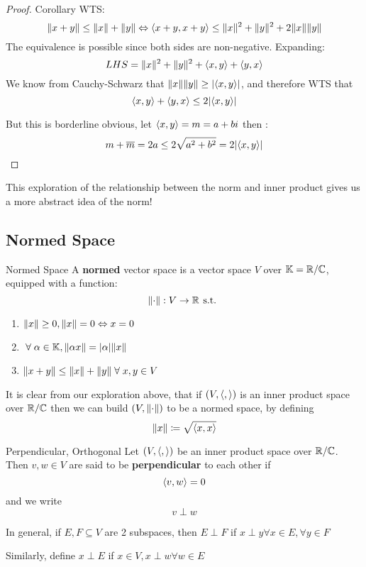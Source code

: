 \begin{proof} {Corollary}
    WTS: \[
        \lVert x + y\rVert \leq \lVert x\rVert + \lVert y\rVert \Leftrightarrow \langle x+y, x+y \rangle \leq \lVert x\rVert^2 + \lVert y\rVert^2 + 2 \lVert x\rVert\lVert y\rVert
    \]
    The equivalence is possible since both sides are non-negative. Expanding:
    \[
        LHS = \lVert x\rVert^2 + \lVert y\rVert^2 + \langle x, y \rangle + \langle y, x \rangle
    \]
    We know from Cauchy-Schwarz that \(\lVert x\rVert \lVert y\rVert \geq \lvert\langle x, y \rangle\rvert\), and therefore WTS that \[
        \langle x, y \rangle + \langle y, x \rangle \leq 2 \lvert\langle x, y \rangle\rvert
    \]

    But this is borderline obvious, let \(\langle x, y \rangle = m = a + bi\) then : \[
        m + \overline{m} = 2 a \leq 2 \sqrt{a^2 + b^2} = 2 \lvert\langle x, y \rangle\rvert
    \]
\end{proof}

This exploration of the relationship between the norm and inner product gives us a more abstract idea of the norm!

\subsection{Normed Space}
\begin{definition} {Normed Space}
    A \textbf{normed} vector space is a vector space \(V\) over \(\mathbb{K} = \mathbb{R} / \mathbb{C}\), equipped with a function: \[
        \lVert\cdot\rVert: V \to \mathbb{R} \hspace*{4pt}\text{s.t.}\hspace*{4pt}
    \]
    \begin{enumerate}
        \item \(\lVert x\rVert \geq 0, \lVert x\rVert = 0 \Leftrightarrow x = 0 \)
        \item \(\forall \alpha \in \bbk, \norm{\alpha x} = \abs{\alpha} \norm{x}\)
        \item \(\norm{x + y} \leq \norm{x} + \norm{y} \forall x, y \in V\)
    \end{enumerate}
\end{definition}

\begin{remark}
    It is clear from our exploration above, that if \((V, \langle ,  \rangle)\) is an inner product space over \(\mathbb{R} / \mathbb{C}\) then we can build \((V, \lVert\cdot\rVert)\) to be a normed space, by defining \[
        \lVert x\rVert \coloneqq \sqrt{\langle x, x \rangle}
    \]
\end{remark}

\begin{definition} {Perpendicular, Orthogonal}
    Let \((V, \langle ,  \rangle)\) be an inner product space over \(\mathbb{R} / \mathbb{C}\). Then \(v, w \in V\) are said to be \textbf{perpendicular} to each other if \[
        \langle v, w \rangle = 0
    \]
    and we write \[
        v \perp w
    \]

    In general, if \(E, F \subseteq V\) are 2 subspaces, then \(E \perp F\) if \(x \perp y \forall x \in E, \forall y \in F\)

    Similarly, define \(x \perp E\) if \(x \in V, x \perp w \forall w \in E\)
\end{definition}

